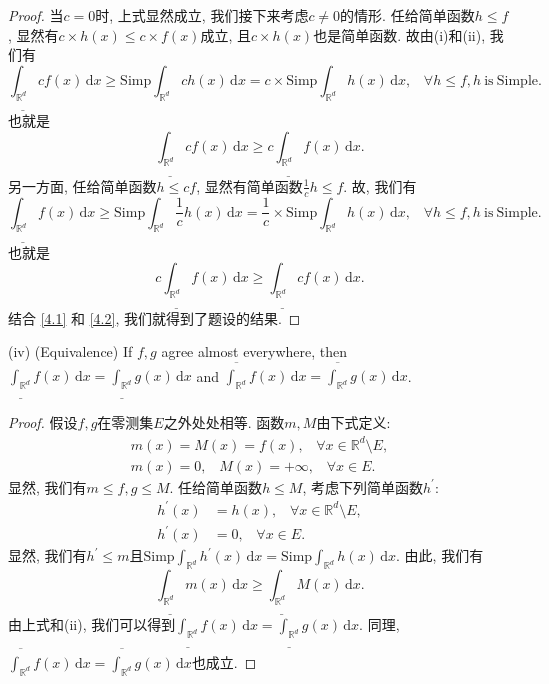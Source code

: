 \documentclass[reqno,a4paper,10pt]{amsart}
\newcommand\dif{\,\mathrm{d}}
\newcommand\Rnum{\mathbb{R}}
\begin{document}
\begin{proof}
    当$c=0$时, 上式显然成立, 我们接下来考虑$c\neq 0$的情形. 任给简单函数$h\leq f$, 显然有$c\times h(x)\leq c\times f(x)$成立, 且$c\times h(x)$也是简单函数. 故由(i)和(ii), 我们有
    \begin{equation*}
        \underline{\int_{\Rnum^d}}cf(x)\dif x\geq \mathrm{Simp}\int_{\Rnum^d} ch(x)\dif x=c\times\mathrm{Simp}\int_{\Rnum^d} h(x)\dif x,\;\;\; \forall h\leq f,h \mathrm{\ is\ Simple}.
    \end{equation*}
    也就是
    \begin{equation}
        \underline{\int_{\Rnum^d}}cf(x)\dif x\geq c\underline{\int_{\Rnum^d}}f(x)\dif x.
        \label{4.1}
    \end{equation}
    另一方面, 任给简单函数$h\leq cf$, 显然有简单函数$\frac{1}{c} h\leq f$. 故, 我们有
    \begin{equation*}
        \underline{\int_{\Rnum^d}}f(x)\dif x\geq \mathrm{Simp}\int_{\Rnum^d} \frac{1}{c}h(x)\dif x=\frac{1}{c}\times\mathrm{Simp}\int_{\Rnum^d} h(x)\dif x,\;\;\; \forall h\leq f,h \mathrm{\ is\ Simple}.
    \end{equation*}
    也就是
    \begin{equation}
        c\underline{\int_{\Rnum^d}}f(x)\dif x\geq \underline{\int_{\Rnum^d}}cf(x)\dif x.
        \label{4.2}
    \end{equation}
    结合 \eqref{4.1} 和 \eqref{4.2}, 我们就得到了题设的结果. 
\end{proof}
(iv) (Equivalence) If $f,g$ agree almost everywhere, then $\underline{\int_{\Rnum^d}}f(x)\dif x=\underline{\int_{\Rnum^d}}g(x)\dif x$ and $\overline{\int_{\Rnum^d}}f(x)\dif x=\overline{\int_{\Rnum^d}}g(x)\dif x$.
\begin{proof}
    假设$f,g$在零测集$E$之外处处相等. 函数$m,M$由下式定义: 
    \begin{equation*}
        \begin{split}
            m(x)=M(x)=f(x),\;\;\;\forall x\in \Rnum^d \setminus E,\\
            m(x)=0,\;\;\;M(x)=+\infty,\;\;\;\forall x\in E.
        \end{split}
    \end{equation*}
    显然, 我们有$m\leq f,g\leq M$. 任给简单函数$h\leq M$, 考虑下列简单函数$h^\prime$: 
    \begin{equation*}
        \begin{split}
            h^\prime(x)&=h(x),\;\;\;\forall x\in\Rnum^d \setminus E,\\
            h^\prime(x)&=0,\;\;\; \forall x\in E.
        \end{split}
    \end{equation*}
    显然, 我们有$h^\prime\leq m$且$\mathrm{Simp}\int_{\Rnum^d} h^\prime(x)\dif x=\mathrm{Simp}\int_{\Rnum^d} h(x)\dif x$. 由此, 我们有
    \begin{equation*}
        \underline{\int_{\Rnum^d}}m(x)\dif x\geq \underline{\int_{\Rnum^d}}M(x)\dif x.
    \end{equation*}
    由上式和(ii), 我们可以得到$\underline{\int_{\Rnum^d}}f(x)\dif x=\underline{\int_{\Rnum^d}}g(x)\dif x$. 同理, $\overline{\int_{\Rnum^d}}f(x)\dif x=\overline{\int_{\Rnum^d}}g(x)\dif x$也成立. 
\end{proof}
\end{document}
